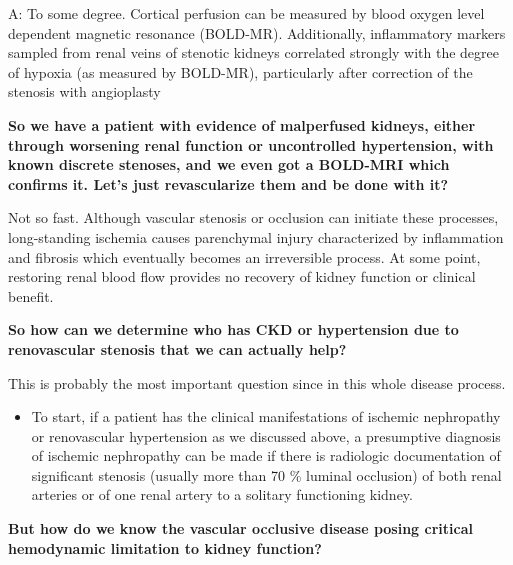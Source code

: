 \documentclass[
]{book}
\providecommand{\tightlist}{%
  \setlength{\itemsep}{0pt}\setlength{\parskip}{0pt}}
\begin{document}
A: To some degree. Cortical perfusion can be measured by blood oxygen
level dependent magnetic resonance (BOLD-MR). Additionally, inflammatory
markers sampled from renal veins of stenotic kidneys correlated strongly
with the degree of hypoxia (as measured by BOLD-MR), particularly after
correction of the stenosis with angioplasty

\textbf{So we have a patient with evidence of malperfused kidneys, either
through worsening renal function or uncontrolled hypertension, with
known discrete stenoses, and we even got a BOLD-MRI which confirms it.
Let's just revascularize them and be done with it?}

Not so fast. Although vascular stenosis or occlusion can initiate these
processes, long-standing ischemia causes parenchymal injury
characterized by inflammation and fibrosis which eventually becomes an
irreversible process. At some point, restoring renal blood flow provides
no recovery of kidney function or clinical benefit.

\textbf{So how can we determine who has CKD or hypertension due to
renovascular stenosis that we can actually help?}

This is probably the most important question since in this whole disease
process.

\begin{itemize}
\tightlist
\item
  To start, if a patient has the clinical manifestations of ischemic
  nephropathy or renovascular hypertension as we discussed above, a
  presumptive diagnosis of ischemic nephropathy can be made if there
  is radiologic documentation of significant stenosis (usually more
  than 70 \% luminal occlusion) of both renal arteries or of one renal
  artery to a solitary functioning kidney.
\end{itemize}

\textbf{But how do we know the vascular occlusive disease posing critical
hemodynamic limitation to kidney function?}
\end{document}
